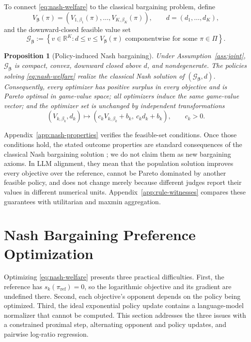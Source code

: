 \documentclass{article}
\newtheorem{proposition}{Proposition}
\theoremstyle{remark}
\theoremstyle{plain}
\newcommand{\G}{\mathcal{G}}
\newcommand{\R}{\mathbb{R}}
\newcommand{\piref}{\pi_{\mathrm{ref}}}
\begin{document}
To connect \eqref{eq:nash-welfare} to the classical bargaining problem, define
\[
V_{\boldsymbol\beta}(\pi)
=(V_{1,\beta_1}(\pi),\ldots,V_{K,\beta_K}(\pi)),
\qquad
d=(d_1,\ldots,d_K),
\]
and the downward-closed feasible value set
\begin{equation}
\G_{\boldsymbol\beta}
:=
\left\{
v\in\R^K:
d\le v\le V_{\boldsymbol\beta}(\pi)
\text{ componentwise for some }\pi\in\Pi
\right\}.
\label{eq:comprehensive-hull}
\end{equation}

\begin{proposition}[Policy-induced Nash bargaining]
\label{prop:nash-outcome}
Under Assumption~\ref{ass:joint}, $\G_{\boldsymbol\beta}$ is compact, convex, downward closed above $d$, and nondegenerate. The policies solving \eqref{eq:nash-welfare} realize the classical Nash solution of $(\G_{\boldsymbol\beta},d)$. Consequently, every optimizer has positive surplus in every objective and is Pareto optimal in game-value space; all optimizers induce the same game-value vector; and the optimizer set is unchanged by independent transformations
\[
(V_{k,\beta_k},d_k)
\mapsto
(c_kV_{k,\beta_k}+b_k,\ c_kd_k+b_k),
\qquad c_k>0.
\]
\end{proposition}
Appendix~\ref{app:nash-properties} verifies the feasible-set conditions. Once those conditions hold, the stated outcome properties are standard consequences of the classical Nash bargaining solution \citep{nash1950}; we do not claim them as new bargaining axioms. In LLM alignment, they mean that the population solution improves every objective over the reference, cannot be Pareto dominated by another feasible policy, and does not change merely because different judges report their values in different numerical units. Appendix~\ref{app:rule-witnesses} compares these guarantees with utilitarian and maxmin aggregation.

\section{Nash Bargaining Preference Optimization}
\label{sec:algorithm}
Optimizing \eqref{eq:nash-welfare} presents three practical difficulties. First, the reference has $s_k(\piref)=0$, so the logarithmic objective and its gradient are undefined there. Second, each objective's opponent depends on the policy being optimized. Third, the ideal exponential policy update contains a language-model normalizer that cannot be computed. This section addresses the three issues with a constrained proximal step, alternating opponent and policy updates, and pairwise log-ratio regression.
\end{document}
